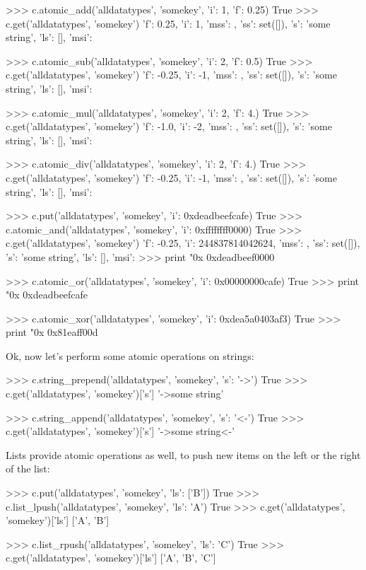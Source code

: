 \begin{pythoncode}
>>> c.atomic_add('alldatatypes', 'somekey', {'i': 1, 'f': 0.25})
True
>>> c.get('alldatatypes', 'somekey')
{'f': 0.25, 'i': 1, 'mss': {}, 'ss': set([]), 's': 'some string', 'ls': [], 'msi': {}}

>>> c.atomic_sub('alldatatypes', 'somekey', {'i': 2, 'f': 0.5})
True
>>> c.get('alldatatypes', 'somekey')
{'f': -0.25, 'i': -1, 'mss': {}, 'ss': set([]), 's': 'some string', 'ls': [], 'msi': {}}

>>> c.atomic_mul('alldatatypes', 'somekey', {'i': 2, 'f': 4.})
True
>>> c.get('alldatatypes', 'somekey')
{'f': -1.0, 'i': -2, 'mss': {}, 'ss': set([]), 's': 'some string', 'ls': [], 'msi': {}}

>>> c.atomic_div('alldatatypes', 'somekey', {'i': 2, 'f': 4.})
True
>>> c.get('alldatatypes', 'somekey')
{'f': -0.25, 'i': -1, 'mss': {}, 'ss': set([]), 's': 'some string', 'ls': [], 'msi': {}}

>>> c.put('alldatatypes', 'somekey', {'i': 0xdeadbeefcafe})
True
>>> c.atomic_and('alldatatypes', 'somekey', {'i': 0xffffffff0000})
True
>>> c.get('alldatatypes', 'somekey')
{'f': -0.25, 'i': 244837814042624, 'mss': {}, 'ss': set([]), 's': 'some string', 'ls': [], 'msi': {}}
>>> print "0x%
0xdeadbeef0000

>>> c.atomic_or('alldatatypes', 'somekey', {'i': 0x00000000cafe})
True
>>> print "0x%
0xdeadbeefcafe

>>> c.atomic_xor('alldatatypes', 'somekey', {'i': 0xdea5a0403af3})
True
>>> print "0x%
0x81eaff00d
\end{pythoncode}

Ok, now let's perform some atomic operations on strings:

\begin{pythoncode}
>>> c.string_prepend('alldatatypes', 'somekey', {'s': '->'})
True
>>> c.get('alldatatypes', 'somekey')['s']
'->some string'

>>> c.string_append('alldatatypes', 'somekey', {'s': '<-'})
True
>>> c.get('alldatatypes', 'somekey')['s']
'->some string<-'
\end{pythoncode}

Lists provide atomic operations as well, to push new items on the left or the
right of the list:

\begin{pythoncode}
>>> c.put('alldatatypes', 'somekey', {'ls': ['B']})
True
>>> c.list_lpush('alldatatypes', 'somekey', {'ls': 'A'})
True
>>> c.get('alldatatypes', 'somekey')['ls']
['A', 'B']

>>> c.list_rpush('alldatatypes', 'somekey', {'ls': 'C'})
True
>>> c.get('alldatatypes', 'somekey')['ls']
['A', 'B', 'C']
\end{pythoncode}

